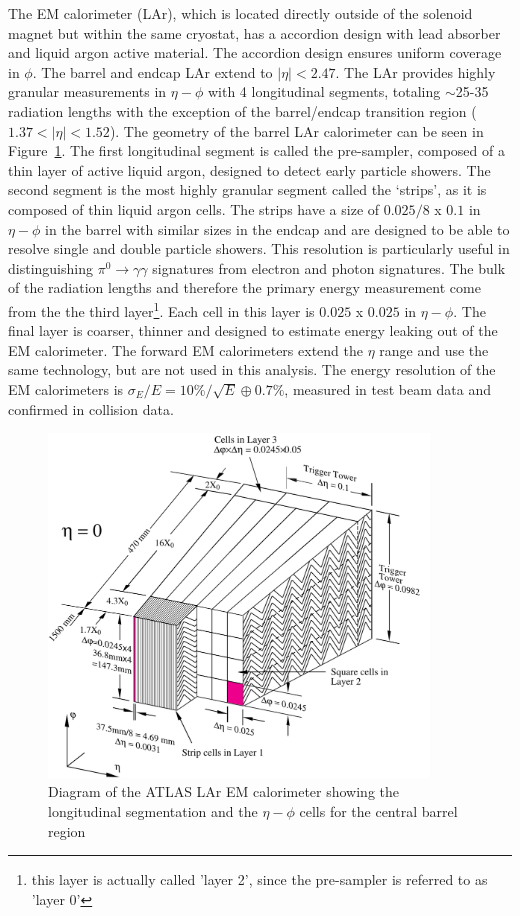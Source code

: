 The EM calorimeter (LAr), which is located directly outside of the solenoid magnet but within the same cryostat, has a accordion design with lead absorber and liquid argon active material. The accordion design ensures uniform coverage in $\phi$. The barrel and endcap LAr extend to $|\eta| < 2.47$. The LAr provides highly granular measurements in $\eta-\phi$ with 4 longitudinal segments, totaling $\sim$25-35 radiation lengths with the exception of the barrel/endcap transition region ($1.37<|\eta|<1.52$).  The geometry of the barrel LAr calorimeter can be seen in Figure~\ref{figure:lhc_calo_em}. The first longitudinal segment is called the pre-sampler, composed of a thin layer of active liquid argon, designed to detect early particle showers. The second segment is the most highly granular segment called the `strips', as it is composed of thin liquid argon cells. The strips have a size of $0.025/8$ x $0.1$ in $\eta-\phi$ in the barrel with similar sizes in the endcap and are designed to be able to resolve single and double particle showers. This resolution is particularly useful in distinguishing $\pi^0\rightarrow\gamma\gamma$ signatures from electron and photon signatures. The bulk of the radiation lengths and therefore the primary energy measurement come from the the third layer\footnote{this layer is actually called 'layer 2', since the pre-sampler is referred to as 'layer 0'}. Each cell in this layer is $0.025$ x $0.025$ in $\eta-\phi$. The final layer is coarser, thinner and designed to estimate energy leaking out of the EM calorimeter. The forward EM calorimeters extend the $\eta$ range and use the same technology, but are not used in this analysis. The energy resolution of the EM calorimeters is $\sigma_E/E = 10\%/\sqrt{E}\oplus0.7\%$, measured in test beam data and confirmed in collision data. 

\begin{figure}[!t]
\centering 
\includegraphics[width=0.9\textwidth]{figs/lhc/LARG3-TDR-barrelM-eps-converted-to}
\caption{Diagram of the ATLAS  LAr EM calorimeter showing the longitudinal segmentation and the $\eta-\phi$ cells for the central barrel region}
\label{figure:lhc_calo_em}
\end{figure}




